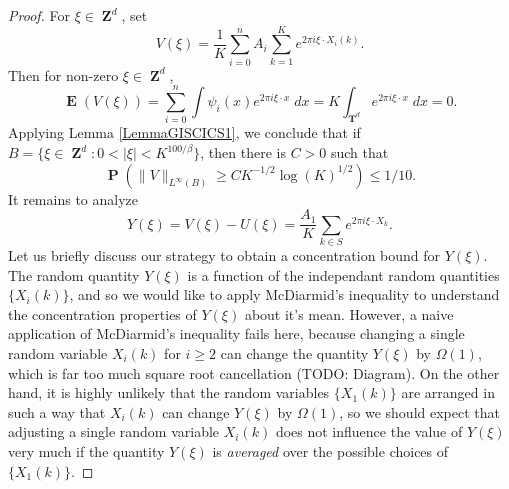 \documentclass[12pt,reqno]{article}
\numberwithin{equation}{section}
\DeclareMathOperator{\ZZ}{\mathbf{Z}}
\DeclareMathOperator{\TT}{\mathbf{T}}
\numberwithin{theorem}{section}
\DeclareMathOperator{\EE}{\mathbf{E}}
\DeclareMathOperator{\PP}{\mathbf{P}}
\begin{document}
\begin{proof}
    For $\xi \in \ZZ^d$, set
    \begin{equation}
        V(\xi) = \frac{1}{K} \sum_{i = 0}^n A_i \sum_{k = 1}^K e^{2 \pi i \xi \cdot X_i(k)}.
    \end{equation}
    Then for non-zero $\xi \in \ZZ^d$,
    \begin{equation}
        \EE(V(\xi)) = \sum_{i = 0}^n \int \psi_i(x) e^{2 \pi i \xi \cdot x}\; dx = K \int_{\TT^d} e^{2 \pi i \xi \cdot x}\; dx = 0.
    \end{equation}
    Applying Lemma \ref{LemmaGISCICS1}, we conclude that if $B = \{ \xi \in \ZZ^d: 0 < |\xi| < K^{100/\beta} \}$, then there is $C > 0$ such that
    \begin{equation} \label{equationCOIACOIAJCPPPPP}
        \PP \left( \| V \|_{L^\infty(B)} \geq C K^{-1/2} \log(K)^{1/2} \right) \leq 1/10.
    \end{equation}
    It remains to analyze
    \begin{equation}
        Y(\xi) = V(\xi) - U(\xi) = \frac{A_1}{K} \sum_{k \in S} e^{2 \pi i \xi \cdot X_k}.
    \end{equation}
    Let us briefly discuss our strategy to obtain a concentration bound for $Y(\xi)$. The random quantity $Y(\xi)$ is a function of the independant random quantities $\{ X_i(k) \}$, and so we would like to apply McDiarmid's inequality to understand the concentration properties of $Y(\xi)$ about it's mean. However, a naive application of McDiarmid's inequality fails here, because changing a single random variable $X_i(k)$ for $i \geq 2$ can change the quantity $Y(\xi)$ by $\Omega(1)$, which is far too much square root cancellation (TODO: Diagram). On the other hand, it is highly unlikely that the random variables $\{ X_1(k) \}$ are arranged in such a way that $X_i(k)$ can change $Y(\xi)$ by $\Omega(1)$, so we should expect that adjusting a single random variable $X_i(k)$ does not influence the value of $Y(\xi)$ very much if the quantity $Y(\xi)$ is \emph{averaged} over the possible choices of $\{ X_1(k) \}$.


\end{proof}
\end{document}
